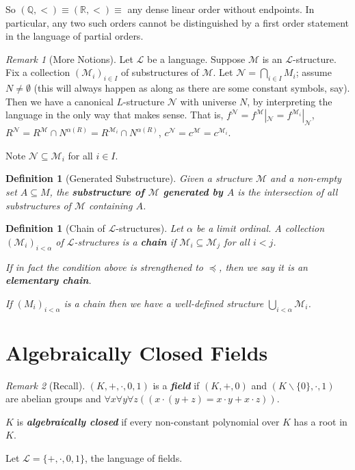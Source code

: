 \documentclass[]{article}
\theoremstyle{custhm}
\theoremstyle{cusdef}
\newtheorem{defin}[theorem]{Definition}
\theoremstyle{custhm}
\theoremstyle{custhm}
\theoremstyle{custhm}
\theoremstyle{ex}
\theoremstyle{custhm}
\theoremstyle{cusdef}
\theoremstyle{remark}
\newtheorem*{remark*}{Remark}
\theoremstyle{remark}
\newcommand{\Q}{\mathbb{Q}}
\newcommand{\R}{\mathbb{R}}
\newcommand{\undf}[1]{\textit{\textbf{#1}}}
\renewcommand{\L}{\mathcal{L}}
\newcommand{\M}{\mathcal{M}}
\newcommand{\N}{\mathcal{N}}
\renewcommand{\subset}{\subseteq}
\begin{document}
So $(\Q,<) \equiv (\R,<)\equiv $ any dense linear order without endpoints. In particular, any two such orders cannot be distinguished by a first order statement in the language of partial orders.

\begin{remark*}[More Notions]
Let $\L$ be a language. Suppose $\M$ is an $\L$-structure. Fix a collection $(\M_i)_{i\in I}$ of substructures of $\M$. Let $\N = \bigcap_{i\in I}M_i$; assume $N \ne \emptyset$ (this will always happen as along as there are some constant symbols, say). Then we have a canonical $L$-structure $\N$ with universe $N$, by interpreting the language in the only way that makes sense. That is, $f^\N = f^\M |_\N = f^{\M_i} |_\N$, $R^\N = R^\M \cap N^{\alpha(R)} = R^{\M_i}\cap N^{\alpha(R)}$, $c^\N = c^\M = c^{\M_i}$.

Note $\N \subset \M_i$ for all $i\in I$.
\end{remark*}
\begin{defin}[Generated Substructure]
Given a structure $\M$ and a non-empty set $A\subset M$, the \undf{substructure of $\M$ generated by $A$} is the intersection of all substructures of $\M$ containing $A$.
\end{defin}

\begin{defin}[Chain of $\L$-structures]
Let $\alpha$ be a limit ordinal. A collection $(\M_i)_{i<\alpha}$ of $\L$-structures is a \undf{chain} if $\M_i \subset \M_{j}$ for all $i < j$.

If in fact the condition above is strengthened to $\preceq$, then we say it is an \undf{elementary chain}.

If $(M_i)_{i<\alpha}$ is a chain then we have a well-defined structure $\bigcup_{i < \alpha}\M_i$.
\end{defin}


\section{Algebraically Closed Fields}

\begin{remark*}[Recall]
$(K,+,\cdot,0,1)$ is a \undf{field} if $(K,+,0)$ and $(K\backslash\{0\},\cdot,1)$ are abelian groups and $\forall x\forall y\forall z((x\cdot(y+z) = x\cdot y + x\cdot z))$.

$K$ is \undf{algebraically closed} if every non-constant polynomial over $K$ has a root in $K$.
\end{remark*}
Let $\L = \{+,\cdot,0,1\}$, the language of fields.
\end{document}
